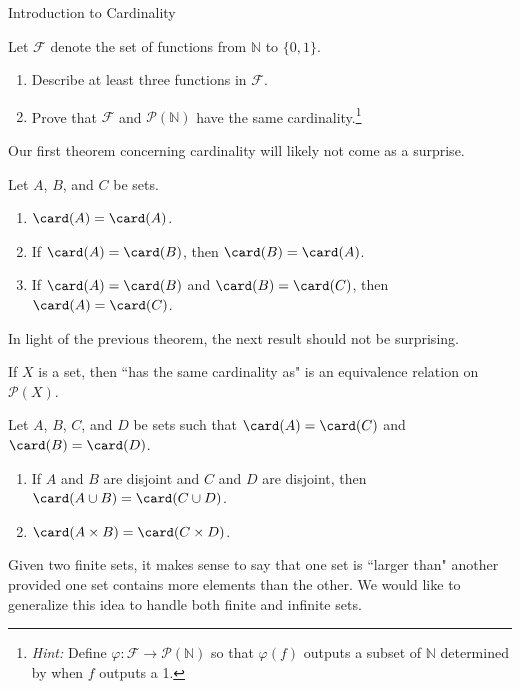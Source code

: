 \begin{section}{Introduction to Cardinality}
\begin{problem}
Let $\mathcal{F}$ denote the set of functions from $\mathbb{N}$ to $\{0,1\}$. 
\begin{enumerate}[label=\textrm{(\alph*)}]
\item Describe at least three functions in $\mathcal{F}$.
\item Prove that $\mathcal{F}$ and $\mathcal{P}(\mathbb{N})$ have the same cardinality.\footnote{\emph{Hint:} Define $\varphi:\mathcal{F}\to \mathcal{P}(\mathbb{N})$ so that $\varphi(f)$ outputs a subset of $\mathbb{N}$ determined by when $f$ outputs a 1.}
\end{enumerate}
\end{problem}

Our first theorem concerning cardinality will likely not come as a surprise.

\begin{theorem}
Let $A$, $B$, and $C$ be sets.
\begin{enumerate}[label=\textrm{(\alph*)}]
\item $\card(A)=\card(A)$.
\item If $\card(A)=\card(B)$, then $\card(B)=\card(A)$.
\item If $\card(A)=\card(B)$ and $\card(B)=\card(C)$, then $\card(A)=\card(C)$.
\end{enumerate}
\end{theorem}

In light of the previous theorem, the next result should not be surprising.

\begin{corollary}
If $X$ is a set, then ``has the same cardinality as" is an equivalence relation on $\mathcal{P}(X)$.
\end{corollary}

\begin{theorem}
Let $A$, $B$, $C$, and $D$ be sets such that $\card(A)=\card(C)$ and $\card(B)=\card(D)$.
\begin{enumerate}[label=\textrm{(\alph*)}]
\item If $A$ and $B$ are disjoint and $C$ and $D$ are disjoint, then $\card(A\cup B)=\card(C\cup D)$.
\item $\card(A\times B)=\card(C\times D)$.
\end{enumerate}
\end{theorem}

Given two finite sets, it makes sense to say that one set is ``larger than" another provided one set contains more elements than the other. We would like to generalize this idea to handle both finite and infinite sets. 


\end{section}
